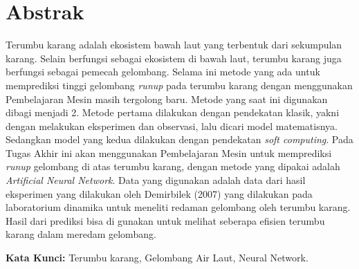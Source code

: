 \chapter*{Abstrak}
Terumbu karang adalah ekosistem bawah laut yang terbentuk dari sekumpulan karang. Selain berfungsi sebagai ekosistem di bawah laut, terumbu karang juga berfungsi sebagai pemecah gelombang. Selama ini metode yang ada untuk memprediksi tinggi gelombang \emph{runup} pada terumbu karang dengan menggunakan Pembelajaran Mesin masih tergolong baru. Metode yang saat ini digunakan dibagi menjadi 2. Metode pertama dilakukan dengan pendekatan klasik, yakni dengan melakukan eksperimen dan observasi, lalu dicari model matematisnya. Sedangkan model yang kedua dilakukan dengan pendekatan \emph{soft computing}. Pada Tugas Akhir ini akan menggunakan Pembelajaran Mesin untuk memprediksi \emph{runup} gelombang di atas terumbu karang, dengan metode yang dipakai adalah \emph{Artificial Neural Network}. Data yang digunakan adalah data dari hasil eksperimen yang dilakukan oleh Demirbilek (2007) \cite{DemirbilekReport} yang dilakukan pada laboratorium dinamika untuk meneliti redaman gelombang oleh terumbu karang. Hasil dari prediksi bisa di gunakan untuk melihat seberapa efisien terumbu karang dalam meredam gelombang.
\vspace{0.5 cm}
\begin{flushleft}
{\textbf{Kata Kunci:} Terumbu karang, Gelombang Air Laut, Neural Network.}
\end{flushleft}